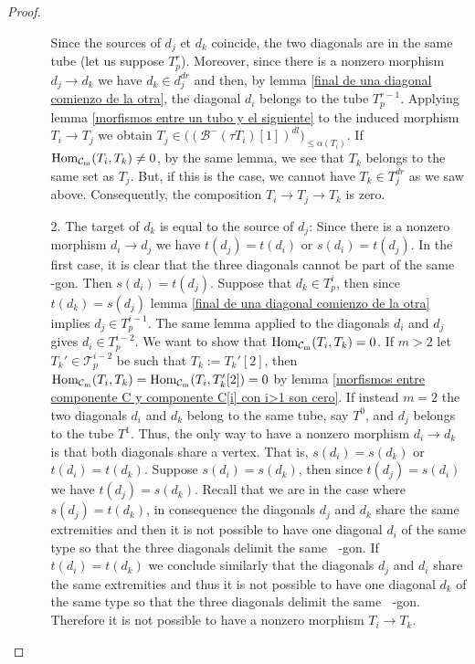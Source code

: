 \documentclass{amsart}
\theoremstyle{plain}
\theoremstyle{definition}
\begin{document}
\begin{proof}
\begin{itemize}
\begin{itemize}
      

     Since the sources of  $d_j$ et $d_k$ coincide, the two diagonals are in the same tube (let us suppose  $T_p^r$). Moreover, since there is  a nonzero morphism $d_j\rightarrow d_k$ we have $d_k\in d_j^{dr}$ and then, by lemma \ref{final de una diagonal comienzo de la otra}, the diagonal $d_i$ belongs to the tube  $T_p^{r-1}$.   Applying lemma \ref{morfismos entre un tubo y el siguiente} to the induced morphism $T_i\rightarrow T_j$  we obtain $T_j\in \bigl((\mathcal{B}^-(\tau T_i)[1])^{dl}\bigr)_{\leq\alpha(T_i)}$. If  ${\mathop{\rm Hom_{\mathcal{C}_m}}\nolimits}(T_i,T_k)\neq 0$, by the same lemma, we see that
      $T_k$ belongs to the same set as $T_j$. But, if this is the case, we cannot have $T_k\in T_j^{dr}$ as we saw above. Consequently,  the composition $T_i\rightarrow T_j\rightarrow T_k$ is zero.\\

  \item [2.] The target of  $d_k$ is equal to the   source of $d_j$: Since there is a nonzero  morphism  $d_i\rightarrow d_j$ we have $t(d_j)=t(d_i)$ or $s(d_i)=t(d_j)$. In the first case, it is clear that the three diagonals cannot be part of the same  ${\mathop{(m+2)}\nolimits}$-gon. Then $s(d_i)=t(d_j)$. Suppose that $d_k\in T^{i}_p$, then since $t(d_k)=s(d_j)$ lemma \ref{final de una diagonal comienzo de la otra} implies  $d_j\in T^{i-1}_p$. The same lemma applied to the diagonals $d_i$ and $d_j$ gives $d_i\in T^{i-2}_p$. We want to show that ${\mathop{\rm Hom_{\mathcal{C}_m}}\nolimits}(T_i,T_k)=0$.
      If $m>2$ let $T_k'\in \mathcal{T}^{i-2}_p$ be such that $T_{k}:=T_k'[2]$, then  ${\mathop{\rm Hom_{\mathcal{C}_m}}\nolimits}(T_i,T_k)={\mathop{\rm Hom_{\mathcal{C}_m}}\nolimits}(T_i,T_{k}'[2])=0$ by  lemma \ref{morfismos entre componente C y componente C[i] con i>1 son cero}. If instead $m=2$ the two diagonals $d_i$ and $d_k$ belong to the same tube, say $T^0$, and $d_j$ belongs to the tube $T^1$. Thus, the only way to have a nonzero  morphism $d_i\rightarrow d_k$ is that both diagonals share a vertex. That is,  $s(d_i)=s(d_k)$ or $t(d_i)=t(d_k)$. Suppose $s(d_i)=s(d_k)$, then since $t(d_j)=s(d_i)$ we have $t(d_j)=s(d_k)$. Recall that we are in the case where  $s(d_j)=t(d_k)$, in consequence the diagonals $d_j$  and $d_k$ share the same extremities and then  it is not possible to have one diagonal $d_i$ of the same  type so that the three  diagonals delimit the same ${\mathop{(m+2)}\nolimits}$-gon. If $t(d_i)=t(d_k)$ we conclude similarly that the diagonals $d_j$  and $d_i$ share the same extremities and thus  it is not possible to have one diagonal $d_k$ of the same  type so that the three  diagonals delimit the same ${\mathop{(m+2)}\nolimits}$-gon. Therefore it is not possible to have a nonzero morphism $T_i \rightarrow T_k$.\\


\end{itemize}
\end{itemize}
\end{proof}
\end{document}
